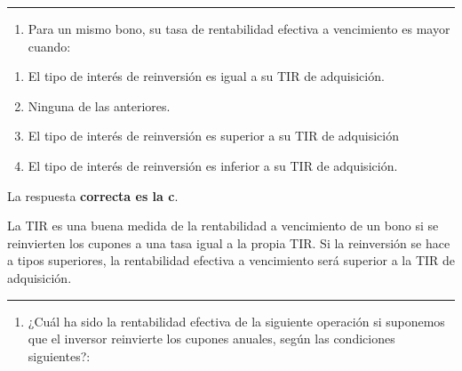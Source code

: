 \documentclass[
  letterpaper,
  DIV=11,
  numbers=noendperiod]{scrartcl}
\providecommand{\tightlist}{%
  \setlength{\itemsep}{0pt}\setlength{\parskip}{0pt}}\usepackage{longtable,booktabs,array}
\begin{document}
\begin{center}\rule{0.5\linewidth}{0.5pt}\end{center}

\begin{enumerate}
\def\labelenumi{\arabic{enumi}.}
\setcounter{enumi}{8}
\tightlist
\item
  Para un mismo bono, su tasa de rentabilidad efectiva a vencimiento es
  mayor cuando:
\end{enumerate}

\begin{enumerate}
\def\labelenumi{\alph{enumi}.}
\item
  El tipo de interés de reinversión es igual a su TIR de adquisición.
\item
  Ninguna de las anteriores.
\item
  El tipo de interés de reinversión es superior a su TIR de adquisición
\item
  El tipo de interés de reinversión es inferior a su TIR de adquisición.
\end{enumerate}

\begin{tcolorbox}[enhanced jigsaw, colframe=quarto-callout-note-color-frame, opacityback=0, colback=white, leftrule=.75mm, left=2mm, breakable, arc=.35mm, rightrule=.15mm, toprule=.15mm, bottomrule=.15mm]
\begin{minipage}[t]{5.5mm}
\textcolor{quarto-callout-note-color}{\faInfo}
\end{minipage}%
\begin{minipage}[t]{\textwidth - 5.5mm}

La respuesta \textbf{correcta es la c}.

La TIR es una buena medida de la rentabilidad a vencimiento de un bono
si se reinvierten los cupones a una tasa igual a la propia TIR. Si la
reinversión se hace a tipos superiores, la rentabilidad efectiva a
vencimiento será superior a la TIR de adquisición.

\end{minipage}%
\end{tcolorbox}

\begin{center}\rule{0.5\linewidth}{0.5pt}\end{center}

\begin{enumerate}
\def\labelenumi{\arabic{enumi}.}
\setcounter{enumi}{9}
\tightlist
\item
  ¿Cuál ha sido la rentabilidad efectiva de la siguiente operación si
  suponemos que el inversor reinvierte los cupones anuales, según las
  condiciones siguientes?:
\end{enumerate}
\end{document}
